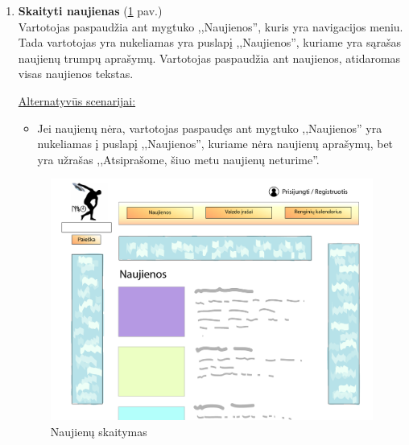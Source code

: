 \documentclass{VUMIFPSkursinis}
\begin{document}
		\begin{enumerate} [label = \textbf{U\arabic*.}]
			\item \textbf{Skaityti naujienas} (\ref{fig:uzd_skaitymas} pav.)\\
				Vartotojas paspaudžia ant mygtuko ,,Naujienos'', kuris yra navigacijos meniu. Tada vartotojas yra nukeliamas yra puslapį ,,Naujienos'', kuriame yra sąrašas naujienų trumpų aprašymų. Vartotojas paspaudžia ant naujienos, atidaromas visas naujienos tekstas.
				
				\underline{Alternatyvūs scenarijai:}
				\begin{itemize}
					\item Jei naujienų nėra, vartotojas paspaudęs ant mygtuko ,,Naujienos'' yra nukeliamas į puslapį ,,Naujienos'', kuriame nėra naujienų aprašymų, bet yra užrašas ,,Atsiprašome, šiuo metu naujienų neturime''. 
				\end{itemize}

				\begin{figure}[H]
					\centering
					\includegraphics[width=\textwidth]{img/PSI4/Naujienos-01.jpg}
					\caption{Naujienų skaitymas}
					\label{fig:uzd_skaitymas}
				\end{figure}
				

\end{enumerate}
\end{document}
